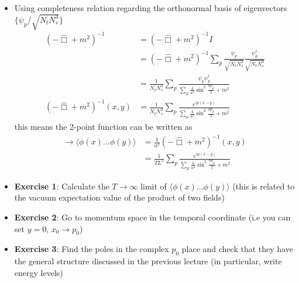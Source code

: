 \documentclass[10pt,a4paper]{article}
\theoremstyle{definition}
\begin{document}
\begin{itemize}
\item Using completeness relation regarding the orthonormal basis of eigenvectors  $\{\psi_p/\sqrt{N_tN_s^3}\}$
\begin{align}
(-\hat{\Box}+m^2)^{-1}
&=(-\hat{\Box}+m^2)^{-1}I\\
&=(-\hat{\Box}+m^2)^{-1}\sum_p\frac{\psi_p}{\sqrt{N_tN_s^3}}\frac{\psi_p^\dagger}{\sqrt{N_tN_s^3}}\\
&=\frac{1}{N_tN_s^3}\sum_p\frac{\psi_p\psi_p^\dagger}{\sum_\mu\frac{4}{a^2}\sin^2\frac{ap_\mu}{2}+m^2}\\
(-\hat{\Box}+m^2)^{-1}(x,y)
&=\frac{1}{N_tN_s^3}\sum_p\frac{e^{ip(x-y)}}{\sum_\mu\frac{4}{a^2}\sin^2\frac{ap_\mu}{2}+m^2}
\end{align}
this means the 2-point function can be written as
\begin{align}
\rightarrow\langle\phi(x)...\phi(y)\rangle
&=\frac{1}{a^4}(-\hat{\Box}+m^2)^{-1}(x,y)\\
&=\frac{1}{TL^3}\sum_p\frac{e^{ip(x-y)}}{\sum_\mu\frac{4}{a^2}\sin^2\frac{ap_\mu}{2}+m^2}
\end{align}
\item {\bf Exercise 1}: Calculate the $T\rightarrow\infty$ limit of $\langle\phi(x)...\phi(y)\rangle$ (this is related to the vacuum expectation value of the product of two fields)
\item {\bf Exercise 2}: Go to momentum space in the temporal coordinate (i.e you can set $y=0$, $x_0\rightarrow p_0$)
\item {\bf Exercise 3}: Find the poles in the complex $p_0$ place and check that they have the general structure discussed in the previous lecture (in particular, write energy levels)
\end{itemize}
\end{document}
